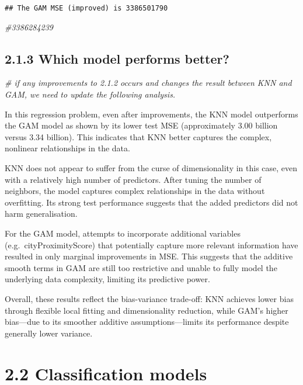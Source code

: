 \documentclass[
]{article}
\newenvironment{Shaded}{\begin{snugshade}}{\end{snugshade}}
\newcommand{\CommentTok}[1]{\textcolor[rgb]{0.56,0.35,0.01}{\textit{#1}}}
\begin{document}
\begin{verbatim}
## The GAM MSE (improved) is 3386501790
\end{verbatim}

\begin{Shaded}
\begin{Highlighting}[]
\CommentTok{\#3386284239 }
\end{Highlighting}
\end{Shaded}

\subsection{2.1.3 Which model performs
better?}\label{which-model-performs-better}

\begin{Shaded}
\begin{Highlighting}[]
\CommentTok{\# if any improvements to 2.1.2 occurs and changes the result between KNN and GAM, we need to update the following analysis.}
\end{Highlighting}
\end{Shaded}

In this regression problem, even after improvements, the KNN model
outperforms the GAM model as shown by its lower test MSE (approximately
3.00 billion versus 3.34 billion). This indicates that KNN better
captures the complex, nonlinear relationships in the data.

KNN does not appear to suffer from the curse of dimensionality in this
case, even with a relatively high number of predictors. After tuning the
number of neighbors, the model captures complex relationships in the
data without overfitting. Its strong test performance suggests that the
added predictors did not harm generalisation.

For the GAM model, attempts to incorporate additional variables
(e.g.~cityProximityScore) that potentially capture more relevant
information have resulted in only marginal improvements in MSE. This
suggests that the additive smooth terms in GAM are still too restrictive
and unable to fully model the underlying data complexity, limiting its
predictive power.

Overall, these results reflect the bias-variance trade-off: KNN achieves
lower bias through flexible local fitting and dimensionality reduction,
while GAM's higher bias---due to its smoother additive
assumptions---limits its performance despite generally lower variance.

\section{2.2 Classification models}\label{classification-models}
\end{document}
